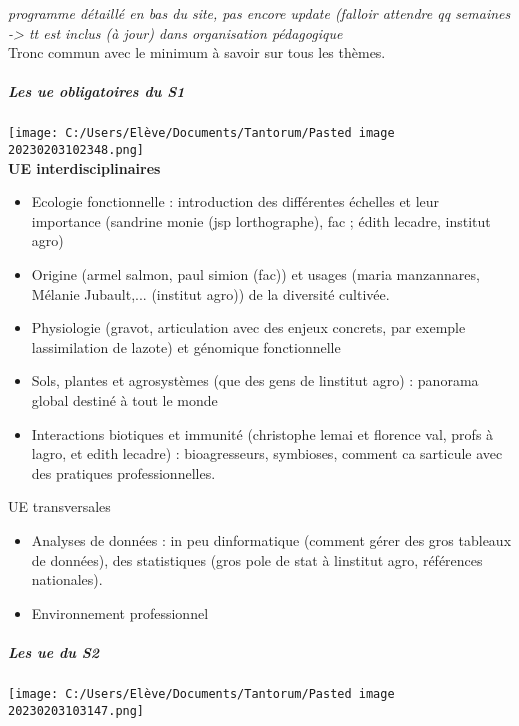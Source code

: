 \documentclass[
]{article}
\providecommand{\tightlist}{%
  \setlength{\itemsep}{0pt}\setlength{\parskip}{0pt}}
\begin{document}
\emph{programme détaillé en bas du site, pas encore update (falloir
attendre qq semaines -\textgreater{} tt est inclus (à jour) dans
organisation pédagogique}\\
Tronc commun avec le minimum à savoir sur tous les thèmes.

\hypertarget{les-ue-obligatoires-du-s1}{%
\subparagraph{Les ue obligatoires du
S1}\label{les-ue-obligatoires-du-s1}}

\texttt{[image: C:/Users/Elève/Documents/Tantorum/Pasted image 20230203102348.png]}\\
\textbf{UE interdisciplinaires}

\begin{itemize}
\tightlist
\item
  Ecologie fonctionnelle : introduction des différentes échelles et leur
  importance (sandrine monie (jsp l\textquotesingle orthographe), fac ;
  édith lecadre, institut agro)
\item
  Origine (armel salmon, paul simion (fac)) et usages (maria
  manzannares, Mélanie Jubault,... (institut agro)) de la diversité
  cultivée.
\item
  Physiologie (gravot, articulation avec des enjeux concrets, par
  exemple l\textquotesingle assimilation de l\textquotesingle azote) et
  génomique fonctionnelle
\item
  Sols, plantes et agrosystèmes (que des gens de
  l\textquotesingle institut agro) : panorama global destiné à tout le
  monde
\item
  Interactions biotiques et immunité (christophe lemai et florence val,
  profs à l\textquotesingle agro, et edith lecadre) : bioagresseurs,
  symbioses, comment ca s\textquotesingle articule avec des pratiques
  professionnelles.
\end{itemize}

UE transversales

\begin{itemize}
\tightlist
\item
  Analyses de données : in peu d\textquotesingle informatique (comment
  gérer des gros tableaux de données), des statistiques (gros pole de
  stat à l\textquotesingle institut agro, références nationales).
\item
  Environnement professionnel
\end{itemize}

\hypertarget{les-ue-du-s2}{%
\subparagraph{Les ue du S2}\label{les-ue-du-s2}}

\texttt{[image: C:/Users/Elève/Documents/Tantorum/Pasted image 20230203103147.png]}
\end{document}
